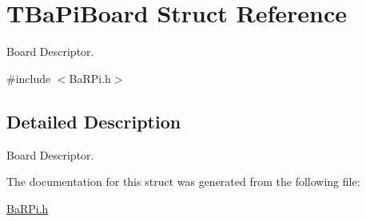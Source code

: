 \hypertarget{structTBaPiBoard}{}\section{T\+Ba\+Pi\+Board Struct Reference}
\label{structTBaPiBoard}


Board Descriptor.  




{\ttfamily \#include $<$Ba\+R\+Pi.\+h$>$}



\subsection{Detailed Description}
Board Descriptor. 

The documentation for this struct was generated from the following file\+:\begin{DoxyCompactItemize}
\item 
\hyperlink{BaRPi_8h}{Ba\+R\+Pi.\+h}\end{DoxyCompactItemize}
